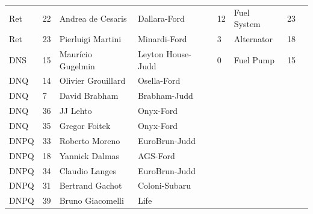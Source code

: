 \documentclass{article}
\begin{document}
\begin{tabular}{llllllll}
Ret & 22 & Andrea de Cesaris & Dallara-Ford & 12 & Fuel System & 23 &  \\
Ret & 23 & Pierluigi Martini & Minardi-Ford & 3 & Alternator & 18 &  \\
DNS & 15 & Maurício Gugelmin & Leyton House-Judd & 0 & Fuel Pump & 15 &  \\
DNQ & 14 & Olivier Grouillard & Osella-Ford &  &  &  &  \\
DNQ & 7 & David Brabham & Brabham-Judd &  &  &  &  \\
DNQ & 36 & JJ Lehto & Onyx-Ford &  &  &  &  \\
DNQ & 35 & Gregor Foitek & Onyx-Ford &  &  &  &  \\
DNPQ & 33 & Roberto Moreno & EuroBrun-Judd &  &  &  &  \\
DNPQ & 18 & Yannick Dalmas & AGS-Ford &  &  &  &  \\
DNPQ & 34 & Claudio Langes & EuroBrun-Judd &  &  &  &  \\
DNPQ & 31 & Bertrand Gachot & Coloni-Subaru &  &  &  &  \\
DNPQ & 39 & Bruno Giacomelli & Life &  &  &  &  \\
\bottomrule
\end{tabular}
\end{document}
